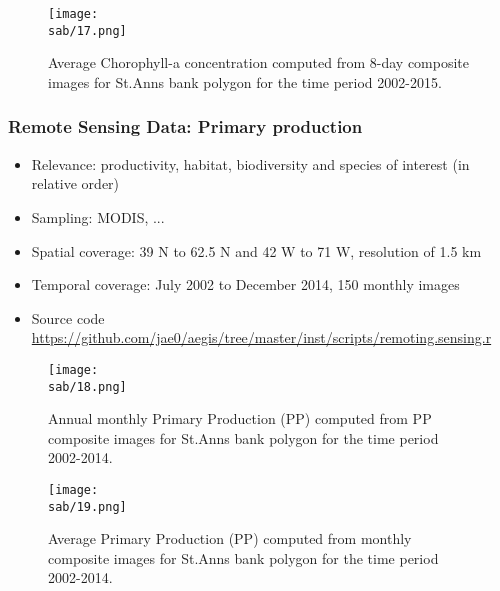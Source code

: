 \documentclass{beamer}
\numberwithin{figure}{section}		%
\numberwithin{table}{section}				%
\newcommand{\D}{.}
\newcommand{\bd}{\string~/bio\D data}   %
\newcommand{\sab}{\bd/mpa/sab}   %
\begin{document}

\begin{frame}[shrink]
  \begin{figure}[h]
    \centering
    \texttt{[image: \\sab/17.png]}
    \caption {Average Chorophyll-a concentration computed from 8-day composite images for St.Anns bank polygon for the time period 2002-2015. }
    \label{fig:ChlaSeasonal}
  \end{figure}
\end{frame}



\begin{frame}
  \frametitle{Remote Sensing Data: Primary production}
  \begin{itemize}
    \item Relevance:  productivity, habitat, biodiversity and species of interest (in relative order)
    \item Sampling:  MODIS, ...
    \item Spatial coverage: 39 N to 62.5 N and 42 W to 71 W, resolution of 1.5 km
    \item Temporal coverage: July 2002 to December 2014, 150 monthly  images
    \item Source code \url{https://github.com/jae0/aegis/tree/master/inst/scripts/remoting.sensing.r}
  \end{itemize}
\end{frame}



\begin{frame}[shrink]
  \begin{figure}[h]
    \centering
    \texttt{[image: \\sab/18.png]}
    \caption{Annual monthly Primary Production (PP) computed from PP composite images for St.Anns bank polygon for the time period 2002-2014.}
    \label{fig:ppTSmonthly}
  \end{figure}
\end{frame}



\begin{frame}[shrink]
  \begin{figure}[h]
    \centering
    \texttt{[image: \\sab/19.png]}
    \caption{Average Primary Production (PP) computed from monthly composite images for St.Anns bank polygon for the time period 2002-2014.}
    \label{fig:ppTSannual}
  \end{figure}
\end{frame}
\end{document}
